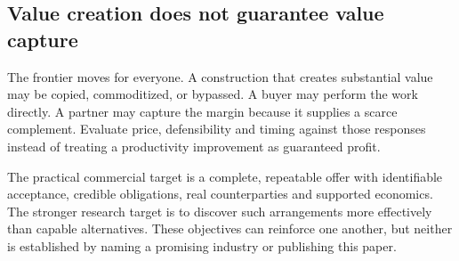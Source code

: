\subsection{Value creation does not guarantee value capture}
The frontier moves for everyone. A construction that creates substantial value may be copied, commoditized, or bypassed. A buyer may perform the work directly. A partner may capture the margin because it supplies a scarce complement. Evaluate price, defensibility and timing against those responses instead of treating a productivity improvement as guaranteed profit.

The practical commercial target is a complete, repeatable offer with identifiable acceptance, credible obligations, real counterparties and supported economics. The stronger research target is to discover such arrangements more effectively than capable alternatives. These objectives can reinforce one another, but neither is established by naming a promising industry or publishing this paper.
